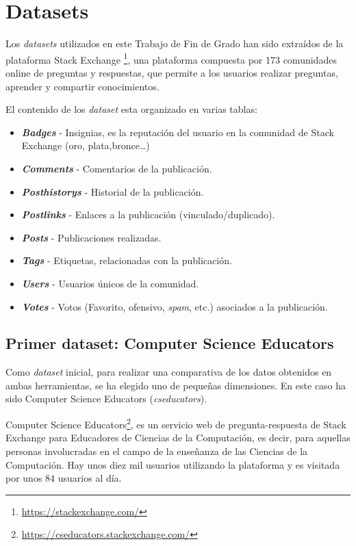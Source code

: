 \documentclass[a4paper, 12pt]{book}
\begin{document}
\clearpage

\section{Datasets}
\label{sec:datasets}

Los \textit{datasets} utilizados en este Trabajo de Fin de Grado han sido extraídos de la plataforma Stack Exchange \footnote{\url{https://stackexchange.com/}}, una plataforma compuesta por 173 comunidades online de preguntas y respuestas, que permite a los usuarios realizar preguntas, aprender y compartir conocimientos.

El contenido de los \textit{dataset} esta organizado en varias tablas: 
 \begin{itemize}
        \item \textbf{\emph{Badges}} - Insignias, es la reputación del usuario en la comunidad de Stack Exchange (oro, plata,bronce\ldots)
        \item \textbf{\emph{Comments}} - Comentarios de la publicación.
        \item \textbf{\emph{Posthistorys}} - Historial de la publicación.
        \item \textbf{\emph{Postlinks}} - Enlaces a la publicación (vinculado/duplicado).
        \item \textbf{\emph{Posts}} - Publicaciones realizadas.
        \item \textbf{\emph{Tags}} - Etiquetas, relacionadas con la publicación.
        \item \textbf{\emph{Users}} - Usuarios únicos de la comunidad. 
        \item \textbf{\emph{Votes}} - Votos (Favorito, ofensivo, \emph{spam}, etc.) asociados a la publicación. 
    \end{itemize}

\subsection{Primer dataset: Computer Science Educators}
\label{sec:cseducators} 
Como \textit{dataset} inicial, para realizar una comparativa de los datos obtenidos en ambas herramientas, se ha elegido uno de pequeñas dimensiones. En este caso ha sido Computer Science Educators (\emph{cseducators}).

Computer Science Educators\footnote{\url{https://cseducators.stackexchange.com/}}, es un servicio web de pregunta-respuesta de Stack Exchange para Educadores de Ciencias de la Computación, es decir, para aquellas personas involucradas en el campo de la enseñanza de las Ciencias de la Computación. Hay unos diez mil usuarios utilizando la plataforma y es visitada por unos 84 usuarios al día. 
\end{document}

